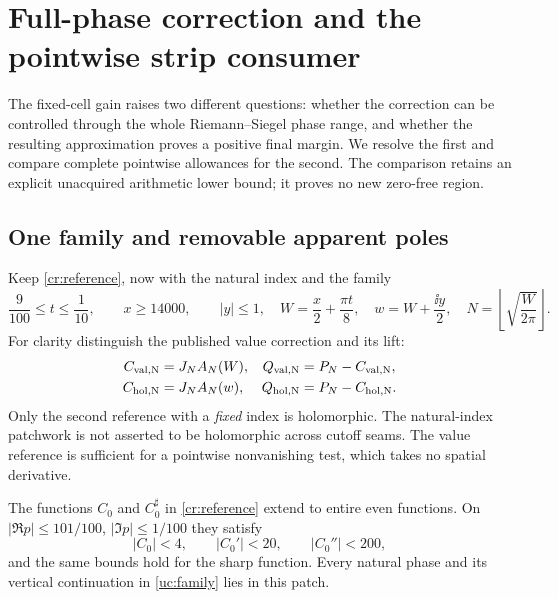 \section{Full-phase correction and the pointwise strip consumer}
\label{sec:uniform-correction}

The fixed-cell gain raises two different questions: whether the correction
can be controlled through the whole Riemann--Siegel phase range, and whether
the resulting approximation proves a positive final margin. We resolve
the first and compare complete pointwise allowances for the second.
The comparison retains an explicit unacquired arithmetic lower bound;
it proves no new zero-free region.

\subsection{One family and removable apparent poles}

Keep \eqref{cr:reference}, now with the natural index and the family
\begin{equation}
 \frac9{100}\le t\le\frac1{10},\qquad x\ge14000,\qquad |y|\le1,
 \quad W=\frac{x}{2}+\frac{\pi t}{8},\quad
 w=W+\frac{\ii y}{2},\quad
 N=\left\lfloor\sqrt{\frac W{2\pi}}\right\rfloor.
 \label{uc:family}
\end{equation}
For clarity distinguish the published value correction and its lift:
\begin{align}
 C_{\rm val,N}&=J_N A_N(W),& Q_{\rm val,N}&=P_N-C_{\rm val,N},\\
 C_{\rm hol,N}&=J_N A_N(w),& Q_{\rm hol,N}&=P_N-C_{\rm hol,N}.
 \label{uc:two-references}
\end{align}
Only the second reference with a \emph{fixed} index is holomorphic.
The natural-index patchwork is not asserted to be holomorphic across
cutoff seams. The value reference is sufficient for a pointwise
nonvanishing test, which takes no spatial derivative.

\begin{lemma}
The functions $C_0$ and $C_0^\sharp$ in \eqref{cr:reference} extend to
entire even functions. On
$|\Re p|\le101/100$, $|\Im p|\le1/100$ they satisfy
\begin{equation}
 |C_0|<4,\qquad |C_0'|<20,\qquad |C_0''|<200,
 \label{uc:C-bounds}
\end{equation}
and the same bounds hold for the sharp function. Every natural phase
and its vertical continuation in \eqref{uc:family} lies in this patch.
\end{lemma}

